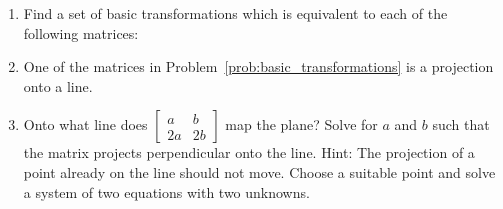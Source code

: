 \documentclass[../textbook.tex]{subfiles}
\begin{document}
\begin{enumerate}
\begin{enumerate}
\item Identify what matrices i through v each do.
\end{enumerate}
Next, we undo this sequence of operations by working backwards:
\vspace{-1em}
$$\mathop{\twomat{1}{0}{0}{-1}}^{\text{i}}
\mathop{\twomat{\frac{3}{\sqrt{13}}}{\frac{2}{\sqrt{13}}}{-\frac{2}{\sqrt{13}}}{\frac{3}{\sqrt{13}}}}^{\text{ii}}
\mathop{\twomat{\sqrt{13}}{0}{0}{\sqrt{13}}}^{\text{iii}}
\mathop{\twomat{1}{\frac{2}{23}}{0}{1}}^{\text{iv}}
\mathop{\twomat{1}{0}{0}{\frac{23}{13}}}^{\text{v}}
\twomat{1}{0}{0}{1}=\twomat{3}{4}{2}{-5}.$$
\begin{enumerate}
\setcounter{enumii}{1}
\item Explain what happens at each matrix, i through v.
\end{enumerate}
\item Find a set of basic transformations which is equivalent to each of the following matrices:\label{prob:basic_transformations}
\begin{enumerate}
\end{enumerate}
\item One of the matrices in Problem~\ref{prob:basic_transformations} is a projection onto a line.
\begin{enumerate}
\end{enumerate}
\item Onto what line does $\left[\begin{smallmatrix} a & b \\ 2a & 2b\end{smallmatrix}\right]$ map the plane? Solve for $a$ and $b$ such that the matrix projects perpendicular onto the line. Hint: The projection of a point already on the line should not move. Choose a suitable point and solve a system of two equations with two unknowns. \label{prob:project_the_plane}

\end{enumerate}
\end{document}
